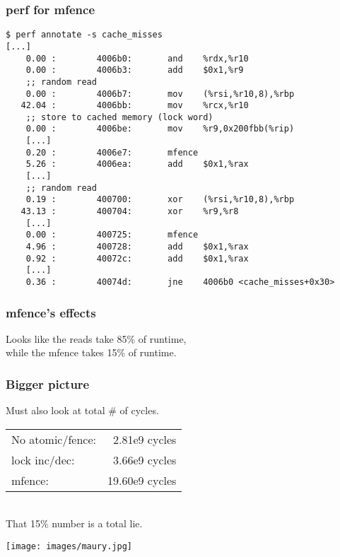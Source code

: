 \begin{frame}[fragile]
  \frametitle{perf for mfence}

  \begin{lstlisting}
$ perf annotate -s cache_misses
[...]
    0.00 :        4006b0:       and    %rdx,%r10
    0.00 :        4006b3:       add    $0x1,%r9
    ;; random read
    0.00 :        4006b7:       mov    (%rsi,%r10,8),%rbp
   42.04 :        4006bb:       mov    %rcx,%r10
    ;; store to cached memory (lock word)
    0.00 :        4006be:       mov    %r9,0x200fbb(%rip)
    [...]
    0.20 :        4006e7:       mfence 
    5.26 :        4006ea:       add    $0x1,%rax
    [...]
    ;; random read
    0.19 :        400700:       xor    (%rsi,%r10,8),%rbp
   43.13 :        400704:       xor    %r9,%r8
    [...]
    0.00 :        400725:       mfence 
    4.96 :        400728:       add    $0x1,%rax
    0.92 :        40072c:       add    $0x1,%rax
    [...]
    0.36 :        40074d:       jne    4006b0 <cache_misses+0x30>
  \end{lstlisting}

\end{frame}

\begin{frame}
  \frametitle{mfence's effects}

  
    Looks like the reads take 85\% of runtime,\\
    while the mfence takes 15\% of runtime.
  

\end{frame}

\begin{frame}
  \frametitle{Bigger picture}

  
    Must also look at total \# of cycles.\\[1em]
    \begin{tabular}{lr}
    No atomic/fence:& 2.81e9 cycles\\
    lock inc/dec: & 3.66e9 cycles\\
    mfence: & 19.60e9 cycles
    \end{tabular}
~\\[1em]
    That 15\% number is a total lie.
  
  \begin{center}
	\texttt{[image: images/maury.jpg]}
\end{center}

\end{frame}

